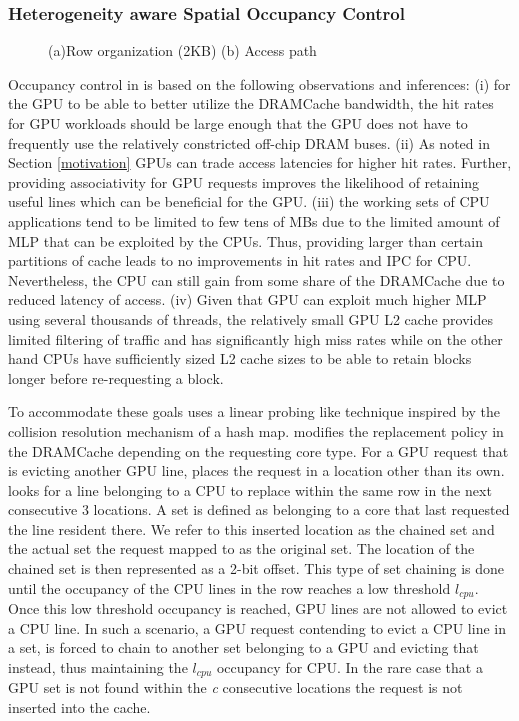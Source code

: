 \subsubsection{Heterogeneity aware Spatial Occupancy Control}
\begin{figure*}[!htb]
    \centering
    \chainaccess
    \caption{\cachename (a)Row organization (2KB) (b) Access path}
    \label{fig:chain-access}
\end{figure*}
Occupancy control in \cachename is based on the following observations and inferences: (i) for the GPU to be able to better utilize the DRAMCache bandwidth, the hit rates for GPU workloads should be large enough that the GPU does not have to frequently use the relatively constricted off-chip DRAM buses. (ii) As noted in Section \ref{motivation} GPUs can trade access latencies for higher hit rates. Further, providing associativity for GPU requests improves the likelihood of retaining useful lines which can be beneficial for the GPU. (iii) the working sets of CPU applications tend to be limited to few tens of MBs due to the limited amount of MLP that can be exploited by the CPUs. Thus, providing larger than certain partitions of cache leads to no improvements in hit rates and IPC for CPU. Nevertheless, the CPU can still gain from some share of the DRAMCache due to reduced latency of access. (iv) Given that GPU can exploit much higher MLP using several thousands of threads, the relatively small GPU L2 cache provides limited filtering of traffic and has significantly high miss rates while on the other hand CPUs have sufficiently sized L2 cache sizes to be able to retain blocks longer before re-requesting a block.
\par To accommodate these goals \cachename uses a linear probing like technique inspired by the collision resolution mechanism of a hash map. \cachename modifies the replacement policy in the DRAMCache depending on the requesting core type. For a GPU request that is evicting another GPU line, \cachename places the request in a location other than its own. \cachename looks for a line belonging to a CPU to replace within the same row in the next consecutive 3 locations. A set is defined as belonging to a core that last requested the line resident there. We refer to this inserted location as the chained set and the actual set the request mapped to as the original set. The location of the chained set is then represented as a 2-bit offset. This type of set chaining is done until the occupancy of the CPU lines in the row reaches a low threshold \textit{$l_{cpu}$}. Once this low threshold occupancy is reached, GPU lines are not allowed to evict a CPU line. In such a scenario, a GPU request contending to evict a CPU line in a set, is forced to chain to another set belonging to a GPU and evicting that instead, thus maintaining the \textit{$l_{cpu}$} occupancy for CPU. In the rare case that a GPU set is not found within the \textit{c} consecutive locations the request is not inserted into the cache.

